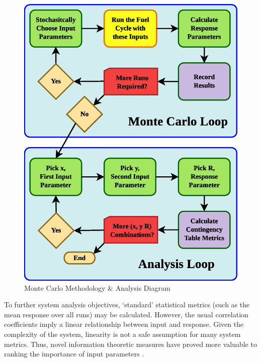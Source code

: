\documentclass[a4paper, 12pt]{article}
\begin{document}
\begin{figure}[htbp]
\begin{center}
\includegraphics[scale=0.70]{figs/MonteCarloMethodology.eps}
\caption{Monte Carlo Methodology \& Analysis Diagram}
\label{mcmethod}
\end{center}
\end{figure}

To further system analysis objectives, `standard' statistical metrics (such as the mean response
over all runs) may be calculated.  However, the usual correlation coefficients imply a linear
relationship between input and response.  Given the complexity of the system, linearity is not
a safe assumption for many system metrics.  Thus, novel information theoretic measures have
proved more valuable to ranking the importance of input parameters \cite{Liu2006}.
\end{document}
